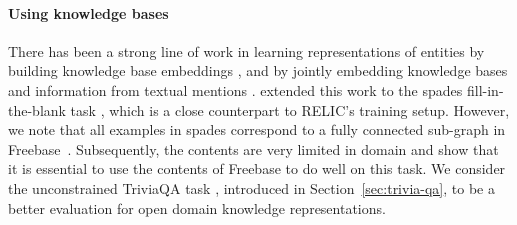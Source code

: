 \documentclass{article} \usepackage{iclr2020_conference,times}
\newcommand{\ack}{RELIC\xspace}
\begin{document}
\paragraph{Using knowledge bases} 
There has been a strong line of work in learning representations of entities by building knowledge base embeddings \citep{bordes2011learning, socher2013reasoning, yang2014embedding, toutanova2016compositional, vilnis2018box}, and by jointly embedding knowledge bases and information from textual mentions \citep{riedel2013relation, toutanova2015representing, hu2015entity}.
\citet{das2017question} extended this work to the {\sc spades} fill-in-the-blank task \citep{bisk2016evaluating}, which is a close counterpart to \ack's training setup.
However, we note that all examples in {\sc spades} correspond to a fully connected sub-graph in Freebase~\cite{bollacker2008freebase}. 
Subsequently, the contents 
are very limited in domain and \citet{das2017question} show that it is essential to use the contents of Freebase to do well on this task. 
We consider the unconstrained TriviaQA task \citep{joshi2017triviaqa}, introduced in Section~\ref{sec:trivia-qa}, to be a better evaluation for open domain knowledge representations.
\end{document}
